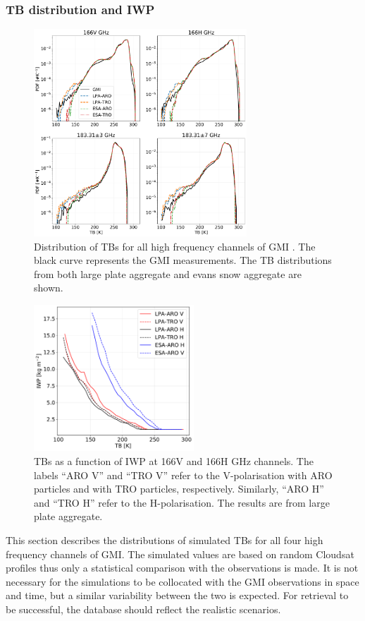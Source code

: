 \documentclass[amt, manuscript]{copernicus}
\begin{document}
\subsubsection{TB distribution and IWP}

\begin{figure}[t]
	\includegraphics[width=8cm]{Figures/PDF_TB_jan.pdf}
	\caption{Distribution of TBs for all high frequency channels of GMI . The black curve represents the GMI measurements. The TB distributions from both large plate aggregate and evans snow aggregate are shown.}
	\label{fig:hist_TB}
\end{figure}

\begin{figure}[t]
	\includegraphics[width=6cm]{Figures/TB_IWP.pdf}
	\caption{TBs as a function of IWP at 166V and 166H\,\,GHz channels. The labels ``ARO V'' and ``TRO V'' refer to the V-polarisation with ARO particles and with TRO particles, respectively. Similarly, ``ARO H'' and ``TRO H'' refer to the H-polarisation. The results are from large plate aggregate.}
	\label{fig:TB_IWP}
\end{figure}

This section describes the distributions of simulated TBs for all four high frequency channels of GMI. The simulated values are based on random Cloudsat profiles thus only a statistical comparison with the observations is made. It is not necessary for the simulations to be collocated with the GMI observations in space and time, but a similar variability between the two is expected. For retrieval to be successful, the database should reflect the realistic scenarios. 
\end{document}

